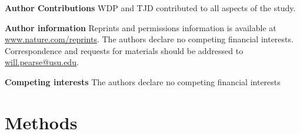 \documentclass[12pt]{report}
\begin{document}
\textbf{Author Contributions} WDP and TJD contributed to all aspects
of the study.

\textbf{Author information} Reprints and permissions information is
available at \url{www.nature.com/reprints}. The authors declare no
competing financial interests. Correspondence and requests for
materials should be addressed to \url{will.pearse@usu.edu}.

\textbf{Competing interests} The authors declare no competing
financial interests

\clearpage

\section*{\Large Methods}

\printbibliography
\end{document}

